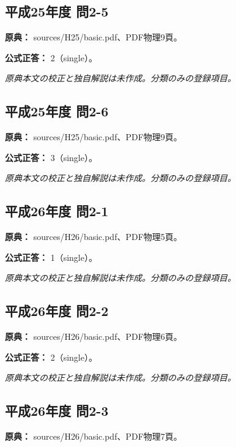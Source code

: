 \subsection{平成25年度 問2-5}
\label{q:h25-reg-basic-2-5}

\noindent\textbf{原典：} sources/H25/basic.pdf、PDF物理9頁。

\textbf{公式正答：} 2（single）。

\par\textit{原典本文の校正と独自解説は未作成。分類のみの登録項目。}

\subsection{平成25年度 問2-6}
\label{q:h25-reg-basic-2-6}

\noindent\textbf{原典：} sources/H25/basic.pdf、PDF物理9頁。

\textbf{公式正答：} 3（single）。

\par\textit{原典本文の校正と独自解説は未作成。分類のみの登録項目。}

\subsection{平成26年度 問2-1}
\label{q:h26-reg-basic-2-1}

\noindent\textbf{原典：} sources/H26/basic.pdf、PDF物理5頁。

\textbf{公式正答：} 1（single）。

\par\textit{原典本文の校正と独自解説は未作成。分類のみの登録項目。}

\subsection{平成26年度 問2-2}
\label{q:h26-reg-basic-2-2}

\noindent\textbf{原典：} sources/H26/basic.pdf、PDF物理6頁。

\textbf{公式正答：} 2（single）。

\par\textit{原典本文の校正と独自解説は未作成。分類のみの登録項目。}

\subsection{平成26年度 問2-3}
\label{q:h26-reg-basic-2-3}

\noindent\textbf{原典：} sources/H26/basic.pdf、PDF物理7頁。

